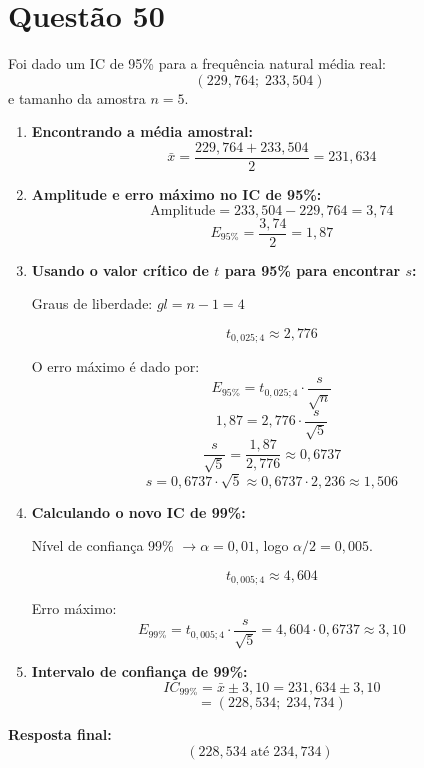 \documentclass[12pt]{article}
\newcommand{\quest}[1]{\section*{Questão #1}} %
\begin{document}
\quest{50}

Foi dado um IC de 95\% para a frequência natural média real:
\[
(229,764 ; \; 233,504)
\]
e tamanho da amostra $n=5$.

\begin{enumerate}
    \item \textbf{Encontrando a média amostral:}
    \[
    \bar{x} = \frac{229,764 + 233,504}{2} = 231,634
    \]
    
    \item \textbf{Amplitude e erro máximo no IC de 95\%:}
    \[
    \text{Amplitude} = 233,504 - 229,764 = 3,74
    \]
    \[
    E_{95\%} = \frac{3,74}{2} = 1,87
    \]
    
    \item \textbf{Usando o valor crítico de $t$ para 95\% para encontrar $s$:}
    
    Graus de liberdade: $gl = n - 1 = 4$
    
    \[
    t_{0,025;4} \approx 2,776
    \]
    
    O erro máximo é dado por:
    \[
    E_{95\%} = t_{0,025;4} \cdot \frac{s}{\sqrt{n}}
    \]
    \[
    1,87 = 2,776 \cdot \frac{s}{\sqrt{5}}
    \]
    \[
    \frac{s}{\sqrt{5}} = \frac{1,87}{2,776} \approx 0,6737
    \]
    \[
    s = 0,6737 \cdot \sqrt{5} \approx 0,6737 \cdot 2,236 \approx 1,506
    \]
    
    \item \textbf{Calculando o novo IC de 99\%:}
    
    Nível de confiança 99\% $\rightarrow \alpha=0,01$, logo $\alpha/2=0,005$.
    
    \[
    t_{0,005;4} \approx 4,604
    \]
    
    Erro máximo:
    \[
    E_{99\%} = t_{0,005;4} \cdot \frac{s}{\sqrt{5}} = 4,604 \cdot 0,6737 \approx 3,10
    \]
    
    \item \textbf{Intervalo de confiança de 99\%:}
    \[
    IC_{99\%} = \bar{x} \pm 3,10 = 231,634 \pm 3,10
    \]
    \[
    = (228,534 ; \; 234,734)
    \]
\end{enumerate}

\textbf{Resposta final:}
\[
\boxed{(228,534 \;\text{até}\; 234,734)}
\]
\end{document}
